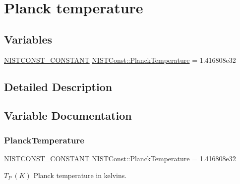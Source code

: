 \hypertarget{group___n_i_s_t_const-_planck_temperature}{}\section{Planck temperature}
\label{group___n_i_s_t_const-_planck_temperature}
\subsection*{Variables}
\begin{DoxyCompactItemize}
\item 
\mbox{\hyperlink{_n_i_s_t_const_8hpp_a2b0fc1d7452373f816175dd86ce26729}{N\+I\+S\+T\+C\+O\+N\+S\+T\+\_\+\+C\+O\+N\+S\+T\+A\+NT}} \mbox{\hyperlink{group___n_i_s_t_const-_planck_temperature_ga3664ff00d4e3913e2be317c2579dac19}{N\+I\+S\+T\+Const\+::\+Planck\+Temperature}} = 1.\+416808e32
\end{DoxyCompactItemize}


\subsection{Detailed Description}


\subsection{Variable Documentation}
\mbox{\label{group___n_i_s_t_const-_planck_temperature_ga3664ff00d4e3913e2be317c2579dac19}} 
\subsubsection{\texorpdfstring{Planck\+Temperature}{PlanckTemperature}}
{\footnotesize\ttfamily \mbox{\hyperlink{_n_i_s_t_const_8hpp_a2b0fc1d7452373f816175dd86ce26729}{N\+I\+S\+T\+C\+O\+N\+S\+T\+\_\+\+C\+O\+N\+S\+T\+A\+NT}} N\+I\+S\+T\+Const\+::\+Planck\+Temperature = 1.\+416808e32}

$T_P \ (K)$ Planck temperature in kelvins. 
